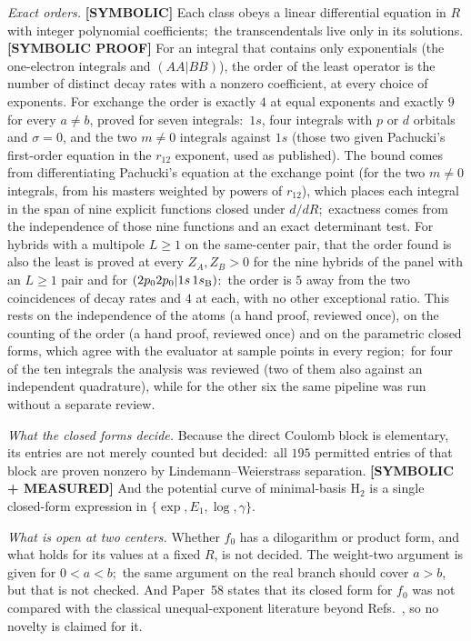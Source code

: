 \documentclass[aps,pra,twocolumn,superscriptaddress,longbibliography]{revtex4-2}
\begin{document}
\emph{Exact orders.}  \textbf{[SYMBOLIC]} Each class obeys a linear
differential equation in $R$ with integer polynomial coefficients;\ the
transcendentals live only in its solutions.  \textbf{[SYMBOLIC PROOF]}
For an integral that contains only exponentials (the one-electron
integrals and $(AA|BB)$), the order of the least operator is the number
of distinct decay rates with a nonzero coefficient, at every choice of
exponents.  For exchange the order is exactly $4$ at equal exponents and
exactly $9$ for every $a\neq b$, proved for seven integrals:\ $1s$, four
integrals with $p$ or $d$ orbitals and $\sigma=0$, and the two $m\neq0$
integrals against $1s$ (those two given Pachucki's first-order equation in the
$r_{12}$ exponent, used as published).  The bound comes from differentiating Pachucki's
equation at the exchange point (for the two $m\neq0$ integrals, from his
masters weighted by powers of $r_{12}$), which places each integral in the span
of nine explicit functions closed under $d/dR$;\ exactness comes from the
independence of those nine functions and an exact determinant test.  For
hybrids with a multipole $L\ge1$ on the same-center pair, that the order found is also the least is proved at every $Z_A,Z_B>0$
for the nine hybrids of the panel with an $L\ge1$ pair and for
$(2p_0 2p_0|1s\,1s_{\rm B})$:\ the order is $5$ away from the two
coincidences of decay rates and $4$ at each, with no other exceptional
ratio.  This rests on the independence of the atoms (a hand proof,
reviewed once), on the counting of the order (a hand proof, reviewed
once) and on the parametric closed forms, which agree with the evaluator
at sample points in every region;\ for four of the ten integrals the
analysis was reviewed (two of them also against an independent
quadrature), while for the other six the same pipeline was run without a
separate review.

\emph{What the closed forms decide.}
Because the direct Coulomb block is elementary, its entries are not
merely counted but decided:\ all $195$ permitted entries of that block are proven nonzero by Lindemann--Weierstrass separation.
\textbf{[SYMBOLIC + MEASURED]} And the
potential curve of minimal-basis H$_2$ is a single closed-form expression
in $\{\exp,E_1,\log,\gamma\}$.

\emph{What is open at two centers.}  Whether $f_0$ has a dilogarithm or
product form, and what holds for its values at a fixed $R$, is not
decided.  The weight-two argument is given for $0<a<b$;\ the same
argument on the real branch should cover $a>b$, but that is not checked.
And Paper~58 states that its closed form for $f_0$ was not compared with
the classical unequal-exponent literature beyond
Refs.~\cite{pachucki2009,lesiuk2014b}, so no novelty is claimed for it.
\end{document}
